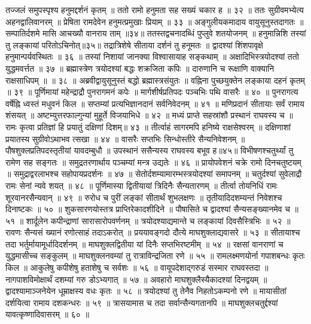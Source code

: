 तज्जलं समुपस्पृश्य हनुमद्दर्शनं कृतम् ॥
ततो रामो हनुमता सह सख्यं चकार ह ॥ ३२ ॥
ततः सुग्रीवमभ्येत्य अहनद्वालिवानरम् ॥
प्रेषिता रामदेवेन हनुमत्प्रमुखाः प्रियाम् ॥ ३३ ॥
अङ्गुलीयकमादाय वायुसूनुस्तदागतः ॥
सम्पातिर्दशमे मासि आचख्यौ वानराय ताम् ॥३४॥
ततस्तद्वचनादब्धिं पुप्लुवे शतयोजनम् ॥
हनुमान्निशि तस्यां तु लङ्कायां परितोऽचिनोत्॥३५॥
तद्रात्रिशेषे सीताया दर्शनं तु हनूमतः ॥
द्वादश्यां शिंशपावृक्षे हनुमान्पर्यवस्थितः ॥ ३६ ॥
तस्यां निशायां जानक्या विश्वासायाह सङ्कथाम् ॥
अक्षादिभिस्त्रयोदश्यां ततो युद्धमवर्त्तत ॥ ३७ ॥
ब्रह्मास्त्रेण त्रयोदश्यां बद्धः शक्रजिता कपिः ॥
दारुणानि च रूक्षाणि वाक्यानि राक्षसाधिपम् ॥ ॥ ३८ ॥
अब्रवीद्वायुसूनुस्तं बद्धो ब्रह्मास्त्रसंयुतः ॥
वह्निना पुच्छयुक्तेन लङ्काया दहनं कृतम् ॥ ३९ ॥
पूर्णिमायां महेन्द्राद्रौ पुनरागमनं कपेः ॥
मार्गशीर्षप्रतिपदः पञ्चभिः पथि वासरैः ॥ ४० ॥
पुनरागत्य वर्षेह्नि ध्वस्तं मधुवनं किल ॥
सप्तम्यां प्रत्यभिज्ञानदानं सर्वनिवेदनम् ॥ ४१ ॥
मणिप्रदानं सीतायाः सर्वं रामाय शंसयत् ॥
अष्टम्युत्तरफाल्गुन्यां मुहूर्ते विजयाभिधे ॥ ४२ ॥
मध्यं प्राप्ते सहस्रांशौ प्रस्थानं राघवस्य च ॥
रामः कृत्वा प्रतिज्ञां हि प्रयातुं दक्षिणां दिशम्॥ ४३ ॥
तीर्त्वाहं सागरमपि हनिष्ये राक्षसेश्वरम् ॥
दक्षिणाशां प्रयातस्य सुग्रीवोऽथाभव त्सखा ॥ ४४ ॥
वासरैः सप्तभिः सिन्धोस्तीरे सैन्यनिवेशनम् ॥
पौषशुक्लप्रतिपदस्तृतीयां यावदम्बुधौ ॥
उपस्थानं ससैन्यस्य राघवस्य बभूव ह॥४५॥
विभीषणश्चतुर्थ्यां तु रामेण सह सङ्गतः ॥
समुद्रतरणार्थाय पञ्चम्यां मन्त्र उद्यतेः ॥ ४६ ॥
प्रायोपवेशनं चक्रे रामो दिनचतुष्टयम् ॥
समुद्राद्वरलाभश्च सहोपायप्रदर्शनः ॥ ४७ ॥
सेतोर्दशम्यामारम्भस्त्रयोदश्यां समापनम् ॥
चतुर्दश्यां सुवेलाद्रौ रामः सेनां न्यवे शयत् ॥ ४८ ॥
पूर्णिमास्या द्वितीयायां त्रिदिनैः सैन्यतारणम् ॥
तीर्त्वा तोयनिधिं रामः शूरवानरसैन्यवान् ॥ ४९ ॥
रुरोध च पुरीं लङ्कां सीतार्थं शुभलक्षणः ॥
तृतीयादिदशम्यन्तं निवेशश्च दिनाष्टकः ॥ ५० ॥
शुकसारणयोस्तत्र प्राप्तिरेकादशीदिने ॥
पौषासिते च द्वादश्यां सैन्यसङ्ख्यानमेव च ॥ ५१ ॥
शार्दूलेन कपीन्द्राणां सारासारोपवर्णनम् ॥
त्रयोदश्याद्यमान्ते च लङ्कायां दिवसैस्त्रिभिः ॥ ५२ ॥
रावणः सैन्यसं ख्यानं रणोत्साहं तदाऽकरोत् ॥
प्रययावङ्गदो दौत्ये माघशुक्लाद्यवासरे ॥ ५३ ॥
सीतायाश्च तदा भर्तुर्मायामूर्धादिदर्शनम् ॥
माघशुक्लद्वितीया यां दिनैः सप्तभिरष्टमीम् ॥ ५४ ॥
रक्षसां वानराणां च युद्धमासीच्च सङ्कुलम् ॥
माघशुक्लनवम्यां तु रात्राविन्द्रजिता रणे ॥ ५५ ॥
रामलक्ष्मणयोर्ना गपाशबन्धः कृतः किल ॥
आकुलेषु कपीशेषु हताशेषु च सर्वशः ॥ ५६ ॥
वायूपदेशाद्गरुडं सस्मार राघवस्तदा ॥
नागपाशविमोक्षार्थं दशम्यां गरु डोऽभ्यगात् ॥ ५७ ॥
अवहारो माघशुक्लैस्यैकादश्यां दिनद्वयम् ॥
द्वादश्यामाञ्जनेयेन धूम्राक्षस्य वधः कृतः ॥ ५८ ॥
त्रयोदश्यां तु तेनैव निहतोऽकम्पनो रणे ॥
मायासीतां दर्शयित्वा रामाय दशकन्धरः ॥ ५९ ॥
त्रासयामास च तदा सर्वान्सैन्यगतानपि ॥
माघशुक्लचतुर्द्दश्यां यावत्कृष्णादिवासरम् ॥ ६० ॥
